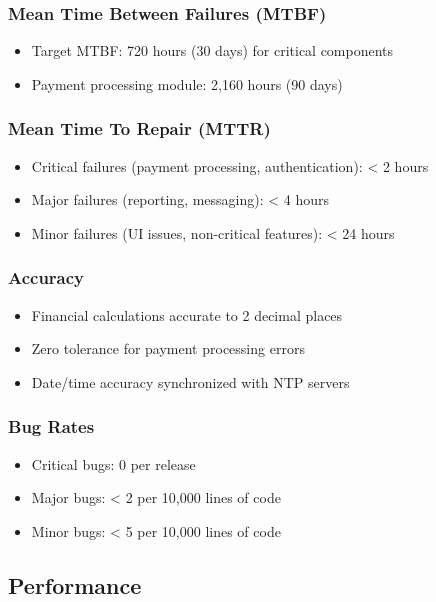 \documentclass[12pt]{article}
\begin{document}
\subsubsection{Mean Time Between Failures (MTBF)}
\begin{itemize}
    \item Target MTBF: 720 hours (30 days) for critical components
    \item Payment processing module: 2,160 hours (90 days)
\end{itemize}

\subsubsection{Mean Time To Repair (MTTR)}
\begin{itemize}
    \item Critical failures (payment processing, authentication): < 2 hours
    \item Major failures (reporting, messaging): < 4 hours
    \item Minor failures (UI issues, non-critical features): < 24 hours
\end{itemize}

\subsubsection{Accuracy}
\begin{itemize}
    \item Financial calculations accurate to 2 decimal places
    \item Zero tolerance for payment processing errors
    \item Date/time accuracy synchronized with NTP servers
\end{itemize}

\subsubsection{Bug Rates}
\begin{itemize}
    \item Critical bugs: 0 per release
    \item Major bugs: < 2 per 10,000 lines of code
    \item Minor bugs: < 5 per 10,000 lines of code
\end{itemize}

\subsection{Performance}
\end{document}
